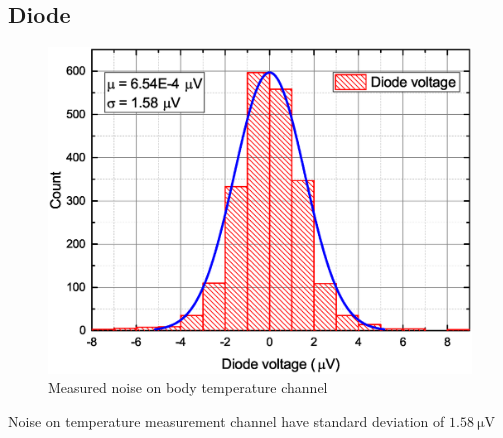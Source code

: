     \subsection{Diode}
        \begin{figure}[H]
            \centering
            \includegraphics[width=0.8\paperwidth]{img/07/diodeVoltage.eps}
            \caption{Measured noise on body temperature channel}
        \end{figure}

        Noise on temperature measurement channel have standard deviation of $\SI{1.58}{\uV}$
